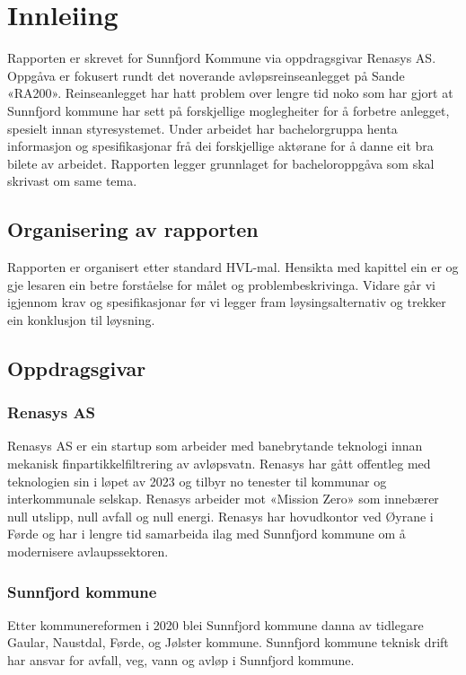 \chapter{Innleiing}
\thispagestyle{fancy}
Rapporten er skrevet for Sunnfjord Kommune via oppdragsgivar Renasys AS.
Oppgåva er fokusert rundt det noverande avløpsreinseanlegget på Sande «RA200». Reinseanlegget har hatt 
problem over lengre tid noko som har gjort at Sunnfjord kommune har sett på forskjellige moglegheiter for å 
forbetre anlegget, spesielt innan styresystemet.
Under arbeidet har bachelorgruppa henta informasjon og spesifikasjonar frå dei forskjellige aktørane for å 
danne eit bra bilete av arbeidet. Rapporten legger grunnlaget for bacheloroppgåva som skal skrivast om same 
tema.

\newpage
\section{Organisering av rapporten}
Rapporten er organisert etter standard HVL-mal.
Hensikta med kapittel ein er og gje lesaren ein betre forståelse for målet og problembeskrivinga. 
Vidare går vi igjennom krav og spesifikasjonar før vi legger fram løysingsalternativ og trekker ein konklusjon til løysning.

\section{Oppdragsgivar}

\subsection{Renasys AS}
Renasys AS er ein startup som arbeider med banebrytande teknologi innan mekanisk finpartikkelfiltrering av avløpsvatn. 
Renasys har gått offentleg med teknologien sin i løpet av 2023 og tilbyr no tenester til kommunar og interkommunale selskap. 
Renasys arbeider mot «Mission Zero» som innebærer null utslipp, null avfall og null energi. Renasys har hovudkontor ved Øyrane i Førde 
og har i lengre tid samarbeida ilag med Sunnfjord kommune om å modernisere avlaupssektoren.
 
\subsection{Sunnfjord kommune}
Etter kommunereformen i 2020 blei Sunnfjord kommune danna av tidlegare Gaular, Naustdal, Førde, og Jølster kommune. Sunnfjord kommune teknisk drift har ansvar for avfall, veg, vann og avløp i Sunnfjord kommune.